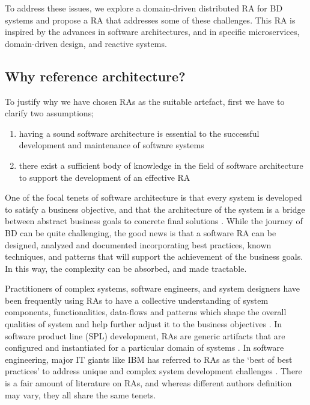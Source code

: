 \documentclass[review]{elsarticle}
\begin{document}
To address these issues, we explore a domain-driven distributed RA for BD systems and propose a RA that addresses some of these challenges. This RA is inspired by the advances in software architectures, and in specific microservices, domain-driven design, and reactive systems. 

\subsection{Why reference architecture?}

To justify why we have chosen RAs as the suitable artefact, first we have to clarify two assumptions;

\begin{enumerate}
    \item having a sound software architecture is essential to the successful development and maintenance of software systems \cite{SoftwareArchitectureKazman}
    \item there exist a sufficient body of knowledge in the field of software architecture to support the development of an effective RA \cite{AtaeiACIS}
\end{enumerate}

One of the focal tenets of software architecture is that every system is developed to satisfy a business objective, and that the architecture of the system is a bridge between abstract business goals to concrete final solutions \cite{SoftwareArchitectureKazman}. While the journey of BD can be quite challenging, the good news is that a software RA can be designed, analyzed and documented incorporating best practices, known techniques, and patterns that will support the achievement of the business goals. In this way, the complexity can be absorbed, and made tractable.

Practitioners of complex systems, software engineers, and system designers have been frequently using RAs to have a collective understanding of system components, functionalities, data-flows and patterns which shape the overall qualities of system and help further adjust it to the business objectives \cite{Cloutier,kohler2019towards}. In software product line (SPL) development, RAs are generic artifacts that are configured and instantiated for a particular domain of systems \cite{Derras}. In software engineering, major IT giants like IBM has referred to RAs as the `best of best practices' to address unique and complex system development challenges \cite{Cloutier}. There is a fair amount of literature on RAs, and whereas different authors definition may vary, they all share the same tenets.
\end{document}

